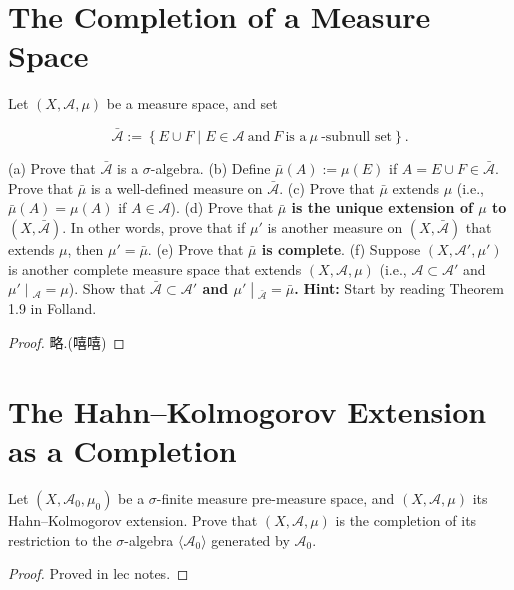 \section{The Completion of a Measure Space}\label{the-completion-of-a-measure-space}

Let \((X,\mathcal{A},\mu)\) be a measure space, and set

\[\bar{\mathcal{A}} := \left\{ {E \cup F \mid E \in \mathcal{A}\ \text{and}\ F\ \text{is a}\ \mu\ \text{-subnull set}} \right\}.\]

(a) Prove that \(\bar{\mathcal{A}}\) is a \(\sigma\)-algebra. (b) Define \(\bar{\mu}(A) := \mu(E)\) if \(A = E \cup F \in \bar{\mathcal{A}}\). Prove that \(\bar{\mu}\) is a well-defined measure on \(\bar{\mathcal{A}}\). (c) Prove that \(\bar{\mu}\) extends \(\mu\) (i.e., \(\bar{\mu}(A) = \mu(A)\) if \(A \in \mathcal{A}\)). (d) Prove that \textbf{\(\bar{\mu}\) is the unique extension of \(\mu\) to \((X,\bar{\mathcal{A}})\)}. In other words, prove that if \(\mu'\) is another measure on \((X,\bar{\mathcal{A}})\) that extends \(\mu\), then \(\mu' = \bar{\mu}\). (e) Prove that \textbf{\(\bar{\mu}\) is complete}. (f) Suppose \((X,\mathcal{A}',\mu')\) is another complete measure space that extends \((X,\mathcal{A},\mu)\) (i.e., \(\mathcal{A} \subset \mathcal{A}'\) and \(\left. \mu' \middle| {}_{\mathcal{A}} = \mu \right.\)). Show that \textbf{\(\bar{\mathcal{A}} \subset \mathcal{A}'\) and \(\left. \mu' \middle| {}_{\bar{\mathcal{A}}} = \bar{\mu} \right.\).} \textbf{Hint:} Start by reading Theorem 1.9 in Folland.

\begin{proof}

略.(嘻嘻)

\end{proof}

\section{The Hahn--Kolmogorov Extension as a Completion}\label{the-hahnkolmogorov-extension-as-a-completion}

Let \((X,\mathcal{A}_{0},\mu_{0})\) be a \(\sigma\)-finite measure pre-measure space, and \((X,\mathcal{A},\mu)\) its Hahn--Kolmogorov extension. Prove that \((X,\mathcal{A},\mu)\) is the completion of its restriction to the \(\sigma\)-algebra \(\langle\mathcal{A}_{0}\rangle\) generated by \(\mathcal{A}_{0}\).

\begin{proof}

Proved in lec notes.

\end{proof}

